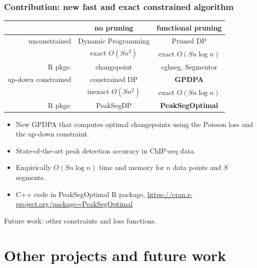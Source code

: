 \documentclass{beamer}
\begin{document}
\begin{frame}
  \frametitle{Contribution: new fast and exact constrained algorithm}
  \begin{tabular}{r|c|c}
    & no pruning & functional pruning \\
    \hline
    unconstrained & Dynamic Programming & Pruned DP \\
     & exact $O(S n^2)$ & exact $O(Sn\log n)$\\
    R pkgs: & changepoint & cghseg, Segmentor\\
    \hline
    up-down constrained & constrained DP & \textbf{GPDPA} \\
     & inexact $O(Sn^2)$ & exact $O(Sn\log n)$\\
    R pkgs: & PeakSegDP & \textbf{PeakSegOptimal}\\
    \hline 
  \end{tabular}
  \begin{itemize}
  \item New GPDPA that computes optimal changepoints 
    using the Poisson loss and the up-down constraint.
  \item State-of-the-art peak detection accuracy in ChIP-seq data.
  \item Empirically $O(S n \log n)$ time and memory for $n$ data
    points and $S$ segments.
  \item C++ code in PeakSegOptimal R package, 
    \url{https://cran.r-project.org/package=PeakSegOptimal}
  \end{itemize}
  Future work: other constraints and loss functions.
\end{frame}

\section{Other projects and future work}
\end{document}
